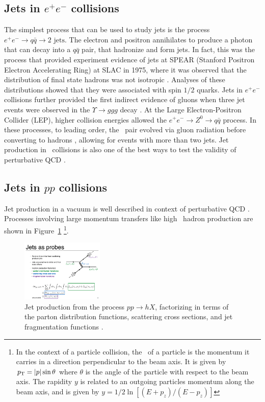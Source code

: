 \subsection{Jets in $e^+ e^-$ collisions}
The simplest process that can be used to study jets is the process $e^+ e^- \rightarrow q \bar{q} \rightarrow 2 \text{ jets}$.
The electron and positron annihilates to produce a photon that can decay into a $q \bar{q}$ pair, that hadronize and form jets.
In fact, this was the process that provided experiment evidence of jets at SPEAR (Stanford Positron Electron Accelerating Ring) at SLAC in 1975, where it was observed that the distribution of final state hadrons was not isotropic \cite{PhysRevLett.35.1609, PhysRevD.26.991}.
Analyses of these distributions showed that they were associated with spin $1/2$ quarks.
Jets in $e^+ e^-$ collisions further provided the first indirect evidence of gluons when three jet events were observed in the $\Upsilon \rightarrow ggg$ decay \cite{Berger:1978rr, Berger:1979cj}. 
At the Large Electron-Positron Collider (LEP), higher collision energies allowed the $e^+ e^- \rightarrow Z^0 \rightarrow q \bar{q}$ process.
In these processes, to leading order, the \qqbar\ pair evolved via gluon radiation before converting to hadrons \cite{Mueller_1991}, allowing for events with more than two jets.
Jet production in \epm\ collisions is also one of the best ways to test the validity of perturbative QCD \cite{Kramer:1986mc}.

\subsection{Jets in $pp$ collisions}
Jet production in a vacuum is well described in context of perturbative QCD \cite{Sjostrand:2007gs}.
Processes involving large momentum transfers like high \pt\ hadron production are shown in Figure~\ref{fig:feynman_jet}
\footnote{In the context of a particle collision, the \pt\ of a particle is the momentum it carries in a direction perpendicular to the beam axis.
It is given by $\mbox{$p_{\mathrm{T}}$} = |p| \sin\theta$ where $\theta$ is the angle of the particle with respect to the beam axis.
The rapidity $y$ is related to an outgoing particles momentum along the beam axis, and is given by $y = 1/2 \ln[(E+p_z) / (E-p_z)]$}.

\begin{figure}[htbp]
\begin{center}
\includegraphics[width=0.35\textwidth]{figures/theory/feynman_jet}
\caption{Jet production from the process $pp \rightarrow hX$, factorizing in terms of the parton distribution functions, scattering cross sections, and jet fragmentation functions \cite{Qin:2015srf}.}
\label{fig:feynman_jet}
\end{center}
\end{figure}


